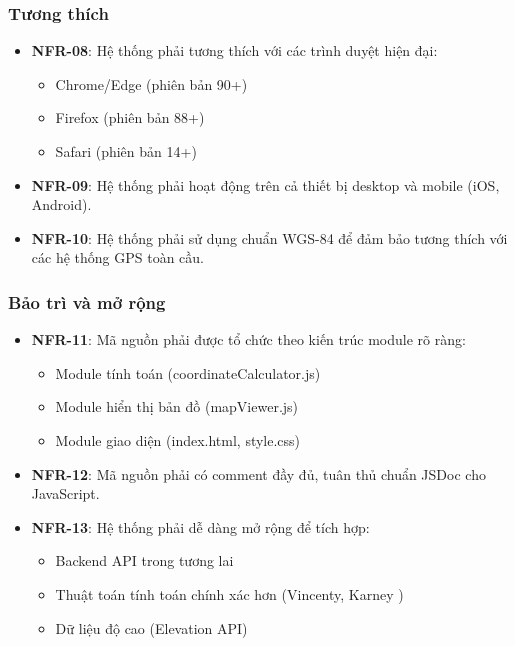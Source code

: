 \subsubsection{Tương thích}
\begin{itemize}
    \item \textbf{NFR-08}: Hệ thống phải tương thích với các trình duyệt hiện đại:
    \begin{itemize}
        \item Chrome/Edge (phiên bản 90+)
        \item Firefox (phiên bản 88+)
        \item Safari (phiên bản 14+)
    \end{itemize}
    \item \textbf{NFR-09}: Hệ thống phải hoạt động trên cả thiết bị desktop và mobile (iOS, Android).
    \item \textbf{NFR-10}: Hệ thống phải sử dụng chuẩn WGS-84 \cite{wgs84} để đảm bảo tương thích với các hệ thống GPS toàn cầu.
\end{itemize}

\subsubsection{Bảo trì và mở rộng}
\begin{itemize}
    \item \textbf{NFR-11}: Mã nguồn phải được tổ chức theo kiến trúc module rõ ràng:
    \begin{itemize}
        \item Module tính toán (coordinateCalculator.js)
        \item Module hiển thị bản đồ (mapViewer.js)
        \item Module giao diện (index.html, style.css)
    \end{itemize}
    \item \textbf{NFR-12}: Mã nguồn phải có comment đầy đủ, tuân thủ chuẩn JSDoc cho JavaScript.
    \item \textbf{NFR-13}: Hệ thống phải dễ dàng mở rộng để tích hợp:
    \begin{itemize}
        \item Backend API trong tương lai
        \item Thuật toán tính toán chính xác hơn (Vincenty, Karney \cite{karney2013algorithms})
        \item Dữ liệu độ cao (Elevation API)
    \end{itemize}
\end{itemize}

